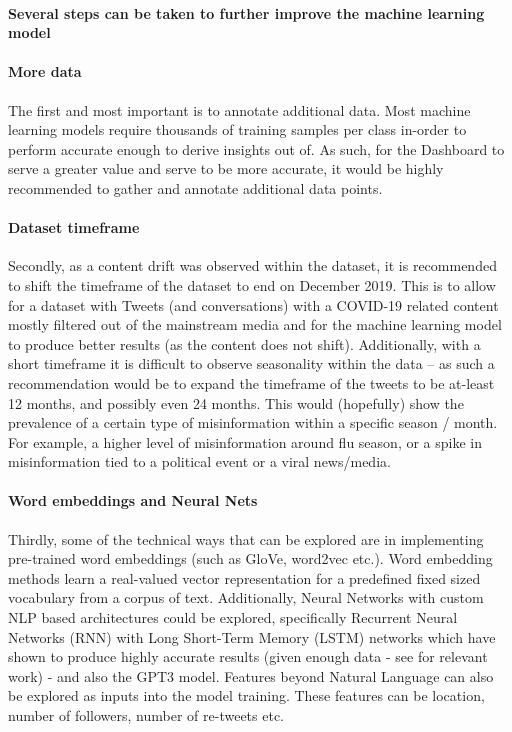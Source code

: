 \documentclass[12pt]{article}
\begin{document}
\paragraph{Several steps can be taken to further improve the machine learning model}

\paragraph{More data} The first and most important is to annotate additional data. Most machine learning models require thousands of training samples per class in-order to perform accurate enough to derive insights out of. As such, for the Dashboard to serve a greater value and serve to be more accurate, it would be highly recommended to gather and annotate additional data points. 


\paragraph{Dataset timeframe} Secondly, as a content drift was observed within the dataset, it is recommended to shift the timeframe of the dataset to end on December 2019. This is to allow for a dataset with Tweets (and conversations) with a COVID-19 related content mostly filtered out of the mainstream media and for the machine learning model to produce better results (as the content does not shift).  Additionally, with a short timeframe it is difficult to observe seasonality within the data – as such a recommendation would be to expand the timeframe of the tweets to be at-least 12 months, and possibly even 24 months. This would (hopefully) show the prevalence of a certain type of misinformation within a specific season / month. For example, a higher level of misinformation around flu season, or a spike in misinformation tied to a political event or a viral news/media.


\paragraph{Word embeddings and Neural Nets} Thirdly, some of the technical ways that can be explored are in implementing pre-trained word embeddings (such as GloVe, word2vec etc.). Word embedding methods learn a real-valued vector representation for a predefined fixed sized vocabulary from a corpus of text. Additionally, Neural Networks with custom NLP based architectures could be explored, specifically Recurrent Neural Networks (RNN) with Long Short-Term Memory (LSTM) networks which have shown to produce highly accurate results (given enough data - see \cite{jiang-2017} for relevant work) - and also the GPT3 model. Features beyond Natural Language can also be explored as inputs into the model training. These features can be location, number of followers, number of re-tweets etc. 
\end{document}
